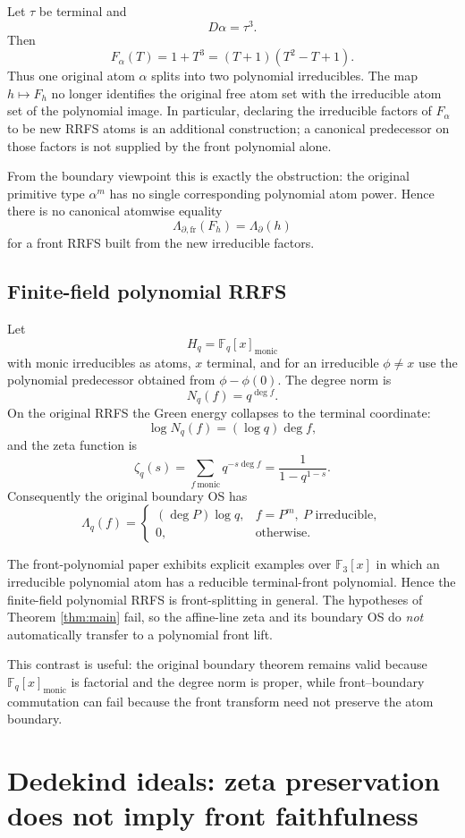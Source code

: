 \documentclass[11pt]{article}
\newcommand{\FF}{\mathbb F}
\newcommand{\fr}{\mathrm{fr}}
\newcommand{\bd}{\partial}
\newcommand{\Lam}{\Lambda}
\begin{document}
Let $\tau$ be terminal and
\[
D\alpha=\tau^3.
\]
Then
\[
F_\alpha(T)=1+T^3=(T+1)(T^2-T+1).
\]
Thus one original atom $\alpha$ splits into two polynomial irreducibles. The map $h\mapsto F_h$ no longer identifies the original free atom set with the irreducible atom set of the polynomial image. In particular, declaring the irreducible factors of $F_\alpha$ to be new RRFS atoms is an additional construction; a canonical predecessor on those factors is not supplied by the front polynomial alone.

From the boundary viewpoint this is exactly the obstruction: the original primitive type $\alpha^m$ has no single corresponding polynomial atom power. Hence there is no canonical atomwise equality
\[
\Lam_{\bd,\fr}(F_h)=\Lam_{\bd}(h)
\]
for a front RRFS built from the new irreducible factors.

\subsection{Finite-field polynomial RRFS}

Let
\[
H_q=\FF_q[x]_{\mathrm{monic}}
\]
with monic irreducibles as atoms, $x$ terminal, and for an irreducible $\phi\ne x$ use the polynomial predecessor obtained from $\phi-\phi(0)$. The degree norm is
\[
N_q(f)=q^{\deg f}.
\]
On the original RRFS the Green energy collapses to the terminal coordinate:
\[
\log N_q(f)=(\log q)\deg f,
\]
and the zeta function is
\[
\zeta_{q}(s)
=
\sum_{f\ \mathrm{monic}}q^{-s\deg f}
=
\frac{1}{1-q^{1-s}}.
\]
Consequently the original boundary OS has
\[
\Lam_q(f)=
\begin{cases}
(\deg P)\log q,&f=P^m,\ P\text{ irreducible},\\
0,&\text{otherwise}.
\end{cases}
\]

The front-polynomial paper exhibits explicit examples over $\FF_3[x]$ in which an irreducible polynomial atom has a reducible terminal-front polynomial. Hence the finite-field polynomial RRFS is front-splitting in general. The hypotheses of Theorem \ref{thm:main} fail, so the affine-line zeta and its boundary OS do \emph{not} automatically transfer to a polynomial front lift.

This contrast is useful: the original boundary theorem remains valid because $\FF_q[x]_{\mathrm{monic}}$ is factorial and the degree norm is proper, while front--boundary commutation can fail because the front transform need not preserve the atom boundary.

\section{Dedekind ideals: zeta preservation does not imply front faithfulness}
\end{document}

